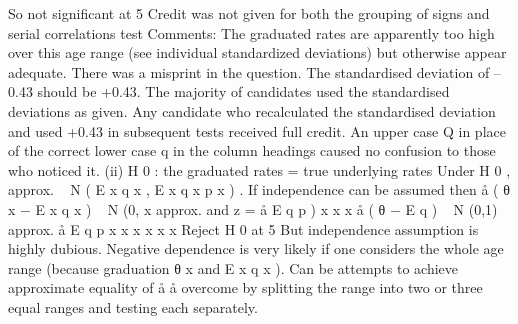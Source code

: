 \documentclass[a4paper,12pt]{article}
\begin{document}
So not significant at 5%
Credit was not given for both the grouping of signs and serial correlations
test
Comments: The graduated rates are apparently too high over this age
range (see individual standardized deviations) but otherwise appear
adequate.
There was a misprint in the question. The standardised deviation of –0.43
should be +0.43. The majority of candidates used the standardised
deviations as given. Any candidate who recalculated the standardised
deviation and used +0.43 in subsequent tests received full credit. An upper
case Q in place of the correct lower case q in the column headings caused no
confusion to those who noticed it.
(ii)
H 0 :
the graduated rates = true underlying rates
Under H 0 , approx. ~ N ( E x q x , E x q x p x ) .
If independence can be assumed then
å ( θ
x
− E x q x ) ~ N (0,
x
approx. and
z =
å E q p )
x
x
x
å ( θ − E q ) ~ N (0,1) approx.
å E q p
x
x
x
x
x
x
Reject H 0 at 5%
But independence assumption is highly dubious. Negative dependence is
very likely if one considers the whole age range (because graduation
θ x and
E x q x ). Can be
attempts to achieve approximate equality of
å
å
overcome by splitting the range into two or three equal ranges and testing
each separately.
\end{document}
